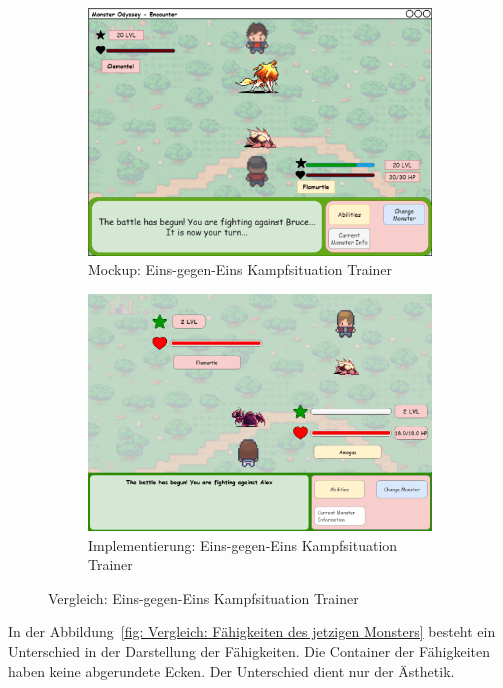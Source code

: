 \begin{figure}[H]
    \centering
    \begin{subfigure}[b]{0.4\textwidth}
        \includegraphics[width=\textwidth]{images/mockups/Encounter/Encounter1v1.png}
        \caption{Mockup:\phantom{EinsEins} Eins-gegen-Eins Kampfsituation Trainer}
        \label{fig: Mockup: Eins-gegen-Eins Kampfsituation Trainer}
    \end{subfigure}
    \hfill
    \begin{subfigure}[b]{0.4\textwidth}
        \includegraphics[width=\textwidth]{images/implementation/Encounter/1v1TrainervsTrainer.PNG}
        \caption{Implementierung: Eins-gegen-Eins Kampfsituation Trainer}
        \label{fig: Implementierung: Eins-gegen-Eins Kampfsituation Trainer}
    \end{subfigure}
    \caption{Vergleich: Eins-gegen-Eins Kampfsituation Trainer}
    \label{fig: Vergleich: Eins-gegen-Eins Kampfsituation Trainer}
\end{figure}
In der Abbildung~\ref{fig: Vergleich: Fähigkeiten des jetzigen Monsters} besteht ein Unterschied in der Darstellung der Fähigkeiten. Die Container der Fähigkeiten haben keine abgerundete Ecken. Der Unterschied dient nur der Ästhetik.

